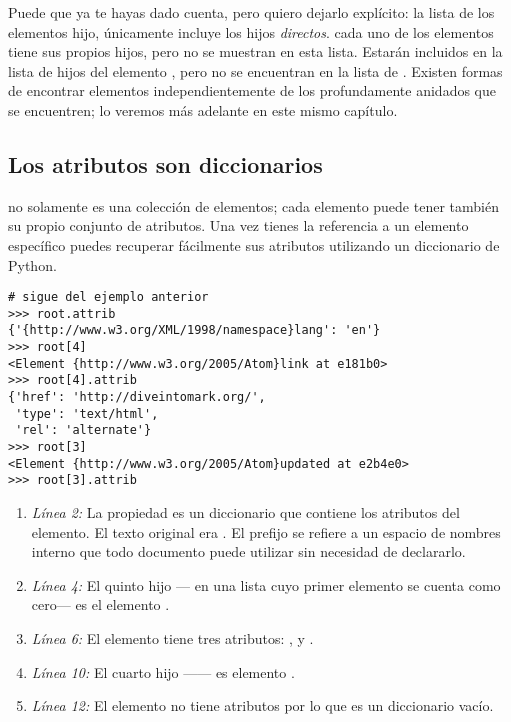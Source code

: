 Puede que ya te hayas dado cuenta, pero quiero dejarlo explícito: la lista de los elementos hijo, únicamente incluye los hijos \emph{directos}. cada uno de los elementos  tiene sus propios hijos, pero no se muestran en esta lista. Estarán incluidos en la lista de hijos del elemento , pero no se encuentran en la lista de . Existen formas de encontrar elementos independientemente de los profundamente anidados que se encuentren; lo veremos más adelante en este mismo capítulo.

\subsection{Los atributos son diccionarios}

 no solamente es una colección de elementos; cada elemento puede tener también su propio conjunto de atributos. Una vez tienes la referencia a un elemento específico puedes recuperar fácilmente sus atributos utilizando un diccionario de Python.

\noindent\begin{minipage}{\textwidth}
\begin{lstlisting}[mathescape=True]
# sigue del ejemplo anterior
>>> root.attrib
{'{http://www.w3.org/XML/1998/namespace}lang': 'en'}
>>> root[4]
<Element {http://www.w3.org/2005/Atom}link at e181b0>
>>> root[4].attrib
{'href': 'http://diveintomark.org/',
 'type': 'text/html',
 'rel': 'alternate'}
>>> root[3]
<Element {http://www.w3.org/2005/Atom}updated at e2b4e0>
>>> root[3].attrib
\end{lstlisting}
\end{minipage}

\begin{enumerate}

\item \emph{Línea 2:} La propiedad  es un diccionario que contiene los atributos del elemento. El texto  original era . El prefijo  se refiere a un espacio de nombres interno que todo documento  puede utilizar sin necesidad de declararlo.

\item \emph{Línea 4:} El quinto hijo ---\codigo{[4]} en una lista cuyo primer elemento se cuenta como cero--- es el elemento .

\item \emph{Línea 6:} El elemento  tiene tres atributos: ,  y .

\item \emph{Línea 10:} El cuarto hijo ---\codigo{[3]}--- es elemento .

\item \emph{Línea 12:} El elemento  no tiene atributos por lo que  es un diccionario vacío.

\end{enumerate}

